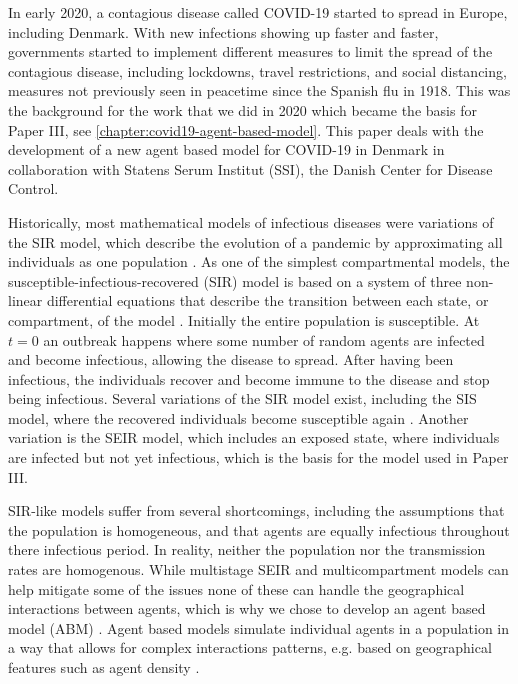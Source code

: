 In early 2020, a contagious disease called COVID-19 started to spread in Europe, including Denmark. With new infections showing up faster and faster, governments started to implement different measures to limit the spread of the contagious disease, including lockdowns, travel restrictions, and social distancing, measures not previously seen in peacetime since the Spanish flu in 1918. This was the background for the work that we did in 2020 which became the basis for Paper III, see \autoref{chapter:covid19-agent-based-model}. This paper deals with the development of a new agent based model for COVID-19 in Denmark in collaboration with Statens Serum Institut (SSI), the Danish Center for Disease Control.

Historically, most mathematical models of infectious diseases were variations of the SIR model, which describe the evolution of a pandemic by approximating all individuals as one population \autocite{kermackContributionMathematicalTheory1927}.
As one of the simplest compartmental models, the susceptible-infectious-recovered (SIR) model is based on a system of three non-linear differential equations that describe the transition between each state, or compartment, of the model \autocite{krogerAnalyticalSolutionSIRmodel2020}.
Initially the entire population is susceptible. At $t=0$ an outbreak happens where some number of random agents are infected and become infectious, allowing the disease to spread. After having been infectious, the individuals recover and become immune to the disease and stop being infectious. Several variations of the SIR model exist, including the SIS model, where the recovered individuals become susceptible again \autocite{hethcoteThreeBasicEpidemiological1989}. Another variation is the SEIR model, which includes an exposed state, where individuals are infected but not yet infectious, which is the basis for the model used in Paper III.

SIR-like models suffer from several shortcomings, including the assumptions that the population is homogeneous, and that agents are equally infectious throughout there infectious period. In reality, neither the population nor the transmission rates are homogenous. While multistage SEIR and multicompartment models can help mitigate some of the issues none of these can handle the geographical interactions between agents, which is why we chose to develop an agent based model (ABM) \autocite{wuMultistageTimeDelayControl2022,tangReviewMultiCompartmentInfectious2020}. Agent based models simulate individual agents in a population in a way that allows for complex interactions patterns, e.g. based on geographical features such as agent density \autocite{wilenskyIntroductionAgentBasedModeling2015}.

